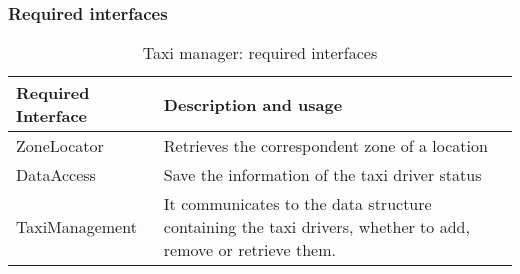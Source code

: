 \subsubsection{Required interfaces}
\begin{table}[H]
	\begin{longtable}{| l | p{} |}
		\hline
		\textbf{Required Interface} & \textbf{Description and usage} \\ \hline
		ZoneLocator & Retrieves the correspondent zone of a location \\ \hline
		DataAccess & Save the information of the taxi driver status \\ \hline
		TaxiManagement & It communicates to the data structure containing the taxi drivers, whether to add, remove or retrieve them. \\ \hline
	\end{longtable}
	\caption{Taxi manager: required interfaces}
	\label{tab:taximanager:requiredInterfaces}
\end{table}
